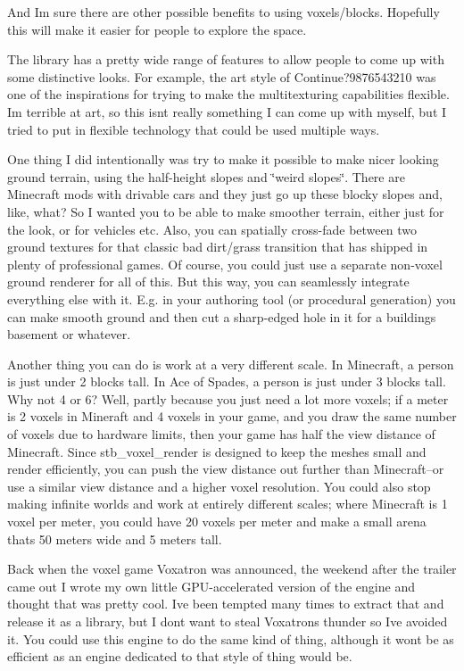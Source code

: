 And I\textquotesingle{}m sure there are other possible benefits to using voxels/blocks. Hopefully this will make it easier for people to explore the space.

The library has a pretty wide range of features to allow people to come up with some distinctive looks. For example, the art style of Continue?9876543210 was one of the inspirations for trying to make the multitexturing capabilities flexible. I\textquotesingle{}m terrible at art, so this isn\textquotesingle{}t really something I can come up with myself, but I tried to put in flexible technology that could be used multiple ways.

One thing I did intentionally was try to make it possible to make nicer looking ground terrain, using the half-\/height slopes and \char`\"{}weird slopes\char`\"{}. There are Minecraft mods with drivable cars and they just go up these blocky slopes and, like, what? So I wanted you to be able to make smoother terrain, either just for the look, or for vehicles etc. Also, you can spatially cross-\/fade between two ground textures for that classic bad dirt/grass transition that has shipped in plenty of professional games. Of course, you could just use a separate non-\/voxel ground renderer for all of this. But this way, you can seamlessly integrate everything else with it. E.\+g. in your authoring tool (or procedural generation) you can make smooth ground and then cut a sharp-\/edged hole in it for a building\textquotesingle{}s basement or whatever.

Another thing you can do is work at a very different scale. In Minecraft, a person is just under 2 blocks tall. In Ace of Spades, a person is just under 3 blocks tall. Why not 4 or 6? Well, partly because you just need a lot more voxels; if a meter is 2 voxels in Mineraft and 4 voxels in your game, and you draw the same number of voxels due to hardware limits, then your game has half the view distance of Minecraft. Since stb\+\_\+voxel\+\_\+render is designed to keep the meshes small and render efficiently, you can push the view distance out further than Minecraft--or use a similar view distance and a higher voxel resolution. You could also stop making infinite worlds and work at entirely different scales; where Minecraft is 1 voxel per meter, you could have 20 voxels per meter and make a small arena that\textquotesingle{}s 50 meters wide and 5 meters tall.

Back when the voxel game Voxatron was announced, the weekend after the trailer came out I wrote my own little GPU-\/accelerated version of the engine and thought that was pretty cool. I\textquotesingle{}ve been tempted many times to extract that and release it as a library, but I don\textquotesingle{}t want to steal Voxatron\textquotesingle{}s thunder so I\textquotesingle{}ve avoided it. You could use this engine to do the same kind of thing, although it won\textquotesingle{}t be as efficient as an engine dedicated to that style of thing would be.

